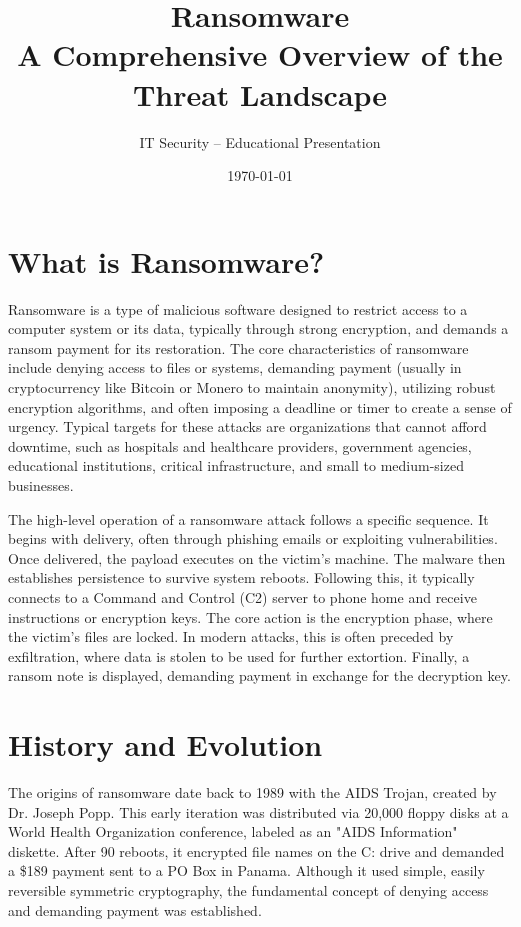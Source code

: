 \documentclass[12pt,a4paper]{article}
\title{\textbf{Ransomware}\\ \Large A Comprehensive Overview of the Threat Landscape}
\author{IT Security -- Educational Presentation}
\date{\today}
\begin{document}
\maketitle
\tableofcontents
\newpage

\section{What is Ransomware?}
Ransomware is a type of malicious software designed to restrict access to a computer system or its data, typically through strong encryption, and demands a ransom payment for its restoration. The core characteristics of ransomware include denying access to files or systems, demanding payment (usually in cryptocurrency like Bitcoin or Monero to maintain anonymity), utilizing robust encryption algorithms, and often imposing a deadline or timer to create a sense of urgency. Typical targets for these attacks are organizations that cannot afford downtime, such as hospitals and healthcare providers, government agencies, educational institutions, critical infrastructure, and small to medium-sized businesses.

The high-level operation of a ransomware attack follows a specific sequence. It begins with delivery, often through phishing emails or exploiting vulnerabilities. Once delivered, the payload executes on the victim's machine. The malware then establishes persistence to survive system reboots. Following this, it typically connects to a Command and Control (C2) server to phone home and receive instructions or encryption keys. The core action is the encryption phase, where the victim's files are locked. In modern attacks, this is often preceded by exfiltration, where data is stolen to be used for further extortion. Finally, a ransom note is displayed, demanding payment in exchange for the decryption key.

\section{History and Evolution}
The origins of ransomware date back to 1989 with the AIDS Trojan, created by Dr. Joseph Popp. This early iteration was distributed via 20,000 floppy disks at a World Health Organization conference, labeled as an "AIDS Information" diskette. After 90 reboots, it encrypted file names on the C: drive and demanded a \$189 payment sent to a PO Box in Panama. Although it used simple, easily reversible symmetric cryptography, the fundamental concept of denying access and demanding payment was established.
\end{document}
